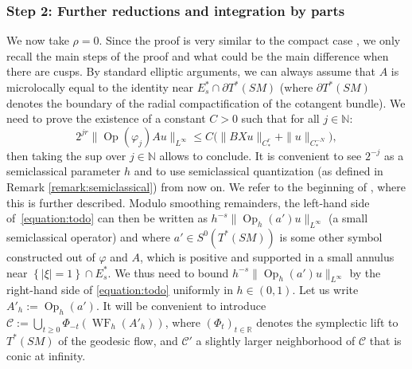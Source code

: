 \documentclass[10pt]{amsart}
\newcommand{\R}{\mathbb{R}}
\newcommand{\N}{\mathbb{N}}
\newcommand{\mc}{\mathcal}
\DeclareMathOperator{\Op}{Op}
\DeclareMathOperator{\WF}{WF}
\theoremstyle{plain}
\theoremstyle{definition}
\begin{document}
\subsubsection*{Step 2: Further reductions and integration by parts} We now take $\rho=0$. Since the proof is very similar to the compact case \cite{Bonthonneau-Lefeuvre-21}, we only recall the main steps of the proof and what could be the main difference when there are cusps. By standard elliptic arguments, we can always assume that $A$ is microlocally equal to the identity near $E_s^* \cap \partial T^*(SM)$ (where $\partial T^*(SM)$ denotes the boundary of the radial compactification of the cotangent bundle). We need to prove the existence of a constant $C > 0$ such that for all $j \in \N$:
\begin{equation}
\label{equation:todo}
2^{jr} \|\Op(\varphi_j) A u \|_{L^\infty} \leq C \bigl( \|BX u\|_{C^r_*} + \|u\|_{C^{-N}_*}\bigr),
\end{equation}
then taking the sup over $j \in \N$ allows to conclude. It is convenient to see $2^{-j}$ as a semiclassical parameter $h$ and to use semiclassical quantization (as defined in Remark \ref{remark:semiclassical}) from now on. We refer to the beginning of \cite[Proof of Th.\,3.2]{Bonthonneau-Lefeuvre-21}, where this is further described. Modulo smoothing remainders, the left-hand side of~\eqref{equation:todo} can then be written as $h^{-s}\|\Op_h(a')u\|_{L^\infty}$ (a small semiclassical operator) and where $a' \in S^0(T^*(SM))$ is some other symbol constructed out of $\varphi$ and $A$, which is positive and supported in a small annulus near $\left\{|\xi|=1\right\} \cap E_s^*$. We thus need to bound $h^{-s} \|\Op_h(a')u\|_{L^\infty}$ by the right-hand side of \eqref{equation:todo} uniformly in $h \in (0,1)$. Let us write $A'_h := \Op_h(a')$. It will be convenient to introduce $\mc{C} := \bigcup_{t \geq 0} \Phi_{-t}(\WF_h(A'_h))$, where $(\Phi_t)_{t \in \R}$ denotes the symplectic lift to $T^*(SM)$ of the geodesic flow, and $\mc{C}'$ a slightly larger neighborhood of $\mc{C}$ that is conic at infinity.
\end{document}
